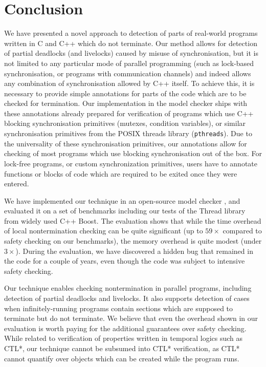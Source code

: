 \section{Conclusion} \label{sec:conclusion}

We have presented a novel approach to detection of parts of real-world programs written in C and C++ which do not terminate.
Our method allows for detection of partial deadlocks (and livelocks) caused by misuse of synchronisation, but it is not limited to any particular mode of parallel programming (such as lock-based synchronisation, or programs with communication channels) and indeed allows any combination of synchronisation allowed by C++ itself.
To achieve this, it is necessary to provide simple annotations for parts of the code which are to be checked for termination.
Our implementation in the \divine model checker ships with these annotations already prepared for verification of programs which use C++ blocking synchronisation primitives (mutexes, condition variables), or similar synchronisation primitives from the POSIX threads library (\texttt{pthreads}).
Due to the universality of these synchronisation primitives, our annotations allow for checking of most programs which use blocking synchronisation out of the box.
For lock-free programs, or custom synchronization primitives, users have to annotate functions or blocks of code which are required to be exited once they were entered.

We have implemented our technique in an open-source model checker \divine, and evaluated it on a set of benchmarks including our tests of the Thread library from widely used C++ Boost.
The evaluation shows that while the time overhead of local nontermination checking can be quite significant (up to $59\times$ compared to safety checking on our benchmarks), the memory overhead is quite modest (under $3\times$).
During the evaluation, we have discovered a hidden bug that remained in the code for a couple of years, even though the code was subject to intensive safety checking.

Our technique enables checking nontermination in parallel programs, including
detection of partial deadlocks and livelocks.
It also supports detection of cases when infinitely-running programs contain
sections which are supposed to terminate but do not terminate.
We believe that even the overhead shown in our evaluation is worth paying for the
additional guarantees over safety checking.
While related to verification of properties written in temporal logics such as CTL*, our technique cannot be subsumed into CTL* verification, as CTL* cannot quantify over objects which can be created while the program runs.

